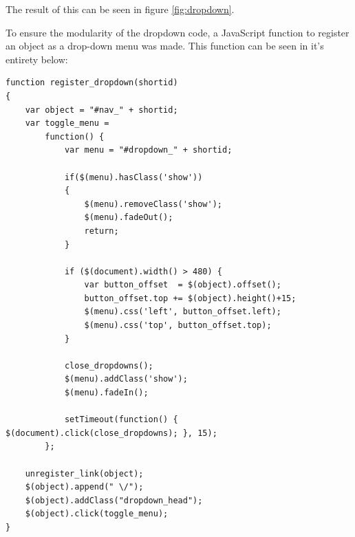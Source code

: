 \documentclass[a4paper]{scrartcl}
\begin{document}
The result of this can be seen in figure \ref{fig:dropdown}.

To ensure the modularity of the dropdown code, a JavaScript function to register an object as a drop-down menu was made. This function can be seen in it's entirety below:

\begin{lstlisting}
function register_dropdown(shortid)                                             
{                                                                               
    var object = "#nav_" + shortid;                                             
    var toggle_menu =                                                           
        function() {                                                            
            var menu = "#dropdown_" + shortid;                                  
                                                                                
            if($(menu).hasClass('show'))                                        
            {                                                                   
                $(menu).removeClass('show');                                    
                $(menu).fadeOut();                                              
                return;                                                         
            }                                                                   
                                                                                
            if ($(document).width() > 480) {                                    
                var button_offset  = $(object).offset();                        
                button_offset.top += $(object).height()+15;                     
                $(menu).css('left', button_offset.left);                        
                $(menu).css('top', button_offset.top);                          
            }                                                                   
                                                                                
            close_dropdowns();                                                  
            $(menu).addClass('show');                                           
            $(menu).fadeIn();                                                   
                                                                                
            setTimeout(function() { $(document).click(close_dropdowns); }, 15); 
        };                                                                      
                                                                                
    unregister_link(object);                                                    
    $(object).append(" \/");                                                     
    $(object).addClass("dropdown_head");                                        
    $(object).click(toggle_menu);                                               
}   
\end{lstlisting}
\end{document}
